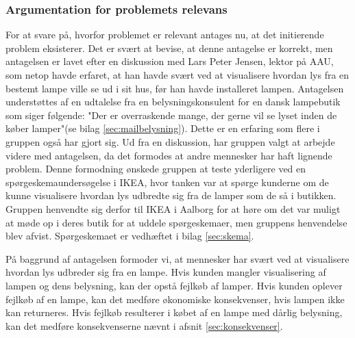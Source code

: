 \subsubsection{Argumentation for problemets relevans}
\label{sec:hvorfor_relavant}
For at svare på, hvorfor problemet er relevant antages nu, at det initierende problem eksisterer. Det er svært at bevise, at denne antagelse er korrekt, men antagelsen er lavet efter en diskussion med Lars Peter Jensen, lektor på AAU, som netop havde erfaret, at han havde svært ved at visualisere hvordan lys fra en bestemt lampe ville se ud i sit hus, før han havde installeret lampen. Antagelsen understøttes af en udtalelse fra en belysningskonsulent for en dansk lampebutik som siger følgende: "Der er overraskende mange, der gerne vil se lyset inden de køber lamper"(se bilag \ref{sec:mailbelysning}). Dette er en erfaring som flere i gruppen også har gjort sig. Ud fra en diskussion, har gruppen valgt at arbejde videre med antagelsen, da det formodes at andre mennesker har haft lignende problem. Denne formodning ønskede gruppen at teste yderligere ved en spørgeskemaundersøgelse i IKEA, hvor tanken var at spørge kunderne om de kunne visualisere hvordan lys udbredte sig fra de lamper som de så i butikken. Gruppen henvendte sig derfor til IKEA i Aalborg for at høre om det var muligt at møde op i deres butik for at uddele spørgeskemaer, men gruppens henvendelse blev afvist. Spørgeskemaet er vedhæftet i bilag \ref{sec:skema}.

På baggrund af antagelsen formoder vi, at mennesker har svært ved at visualisere hvordan lys udbreder sig fra en lampe. Hvis kunden mangler visualisering af lampen og dens belysning, kan der opstå fejlkøb af lamper. Hvis kunden oplever fejlkøb af en lampe, kan det medføre økonomiske konsekvenser, hvis lampen ikke kan returneres. Hvis fejlkøb resulterer i købet af en lampe med dårlig belysning, kan det medføre konsekvenserne nævnt i afsnit \ref{sec:konsekvenser}.